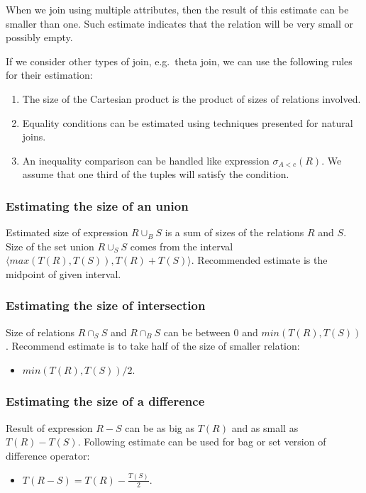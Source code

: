 When we join using multiple attributes, then the result of this estimate can be smaller than one. Such estimate indicates that the relation will be very small or possibly empty.

If we consider other types of join, e.g.~theta join, we can use the following rules for their estimation:
\begin{enumerate}
\item The size of the Cartesian product is the product of sizes of relations involved.
\item Equality conditions can be estimated using techniques presented for natural joins.
\item An inequality comparison can be handled like expression $\sigma_{A<c}(R)$. We assume that one third of the tuples will satisfy the condition. 
\end{enumerate}

\subsubsection{Estimating the size of an union}

Estimated size of expression $R \cup_B S$ is a sum of sizes of the relations $R$ and $S$. Size of the set union $R \cup_S S$ comes from the interval $\langle max(T(R),T(S)),T(R)+T(S)\rangle$. Recommended estimate is the midpoint of given interval.

\subsubsection{Estimating the size of intersection}
Size of relations $R\cap_S S$ and $R\cap_B S$ can be between $0$ and $min(T(R),T(S))$. Recommend estimate is to take half of the size of smaller relation:
\begin{itemize}
\item  $min(T(R),T(S))/2$.
\end{itemize}

\subsubsection{Estimating the size of a difference}

Result of expression $R-S$ can be as big as $T(R)$ and as small as $T(R)-T(S)$. Following estimate can be used for bag or set version of difference operator: 
\begin{itemize}
\item  $T(R-S)=T(R)-\frac{T(S)}{2}$.
\end{itemize}
